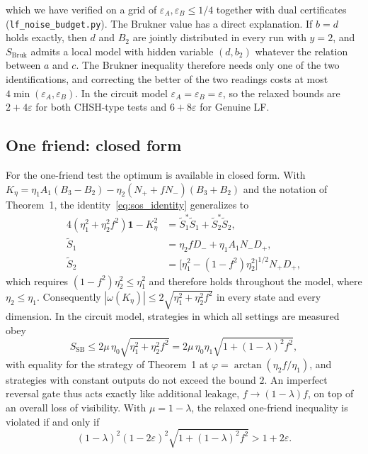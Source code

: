which we have verified on a grid of $\varepsilon_A, \varepsilon_B \le 1/4$ together with dual certificates (\texttt{lf\_noise\_budget.py}). The Brukner value has a direct explanation. If $b = d$ holds exactly, then $d$ and $B_2$ are jointly distributed in every run with $y = 2$, and $S_{\mathrm{Bruk}}$ admits a local model with hidden variable $(d, b_2)$ whatever the relation between $a$ and $c$. The Brukner inequality therefore needs only one of the two identifications, and correcting the better of the two readings costs at most $4\min(\varepsilon_A, \varepsilon_B)$. In the circuit model $\varepsilon_A = \varepsilon_B = \varepsilon$, so the relaxed bounds are $2 + 4\varepsilon$ for both CHSH-type tests and $6 + 8\varepsilon$ for Genuine LF.

\subsection{One friend: closed form}

For the one-friend test the optimum is available in closed form. With $K_\eta = \eta_1 A_1 (B_3 - B_2) - \eta_2 (N_+ + f N_-)(B_3 + B_2)$ and the notation of Theorem~1, the identity~\eqref{eq:sos_identity} generalizes to
\begin{equation}
\begin{aligned}
    4(\eta_1^2 + \eta_2^2 f^2)\mathbf{1} - K_\eta^2 &= \tilde{S}_1^* \tilde{S}_1 + \tilde{S}_2^* \tilde{S}_2, \\
    \tilde{S}_1 &= \eta_2 f D_- + \eta_1 A_1 N_- D_+, \\
    \tilde{S}_2 &= \bigl[\eta_1^2 - (1 - f^2)\eta_2^2\bigr]^{1/2} N_+ D_+,
\end{aligned}
\label{eq:sos_noisy}
\end{equation}
which requires $(1 - f^2)\eta_2^2 \le \eta_1^2$ and therefore holds throughout the model, where $\eta_2 \le \eta_1$. Consequently $|\omega(K_\eta)| \le 2\sqrt{\eta_1^2 + \eta_2^2 f^2}$ in every state and every dimension. In the circuit model, strategies in which all settings are measured obey
\begin{equation}
    S_{\mathrm{SB}} \le 2\mu\,\eta_0\sqrt{\eta_1^2 + \eta_2^2 f^2} = 2\mu\,\eta_0\eta_1\sqrt{1 + (1-\lambda)^2 f^2},
    \label{eq:sb_noisy}
\end{equation}
with equality for the strategy of Theorem~1 at $\varphi = \arctan(\eta_2 f/\eta_1)$, and strategies with constant outputs do not exceed the bound $2$. An imperfect reversal gate thus acts exactly like additional leakage, $f \to (1-\lambda) f$, on top of an overall loss of visibility. With $\mu = 1 - \lambda$, the relaxed one-friend inequality is violated if and only if
\begin{equation}
    (1-\lambda)^2 (1-2\varepsilon)^2 \sqrt{1 + (1-\lambda)^2 f^2} > 1 + 2\varepsilon.
    \label{eq:sb_noisy_condition}
\end{equation}

